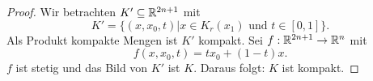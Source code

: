\begin{proof}
	Wir betrachten $K'\subseteq\mathbb{R}^{2n+1}$ mit
	 \[
		 K'=\{(x,x_0,t)|x\in K_r(x_1)\text{ und }t\in [0,1]\} 
	.\] 
	Als Produkt kompakte Mengen ist $K'$ kompakt. Sei $f:\mathbb{R}^{2n+1}\to \mathbb{R}^n$ mit
	\[
	f(x,x_0,t)=tx_0+(1-t)x
	.\] 
	$f$ ist stetig und das Bild von $K'$ ist $K$. Daraus folgt: $K$ ist kompakt.
\end{proof}
